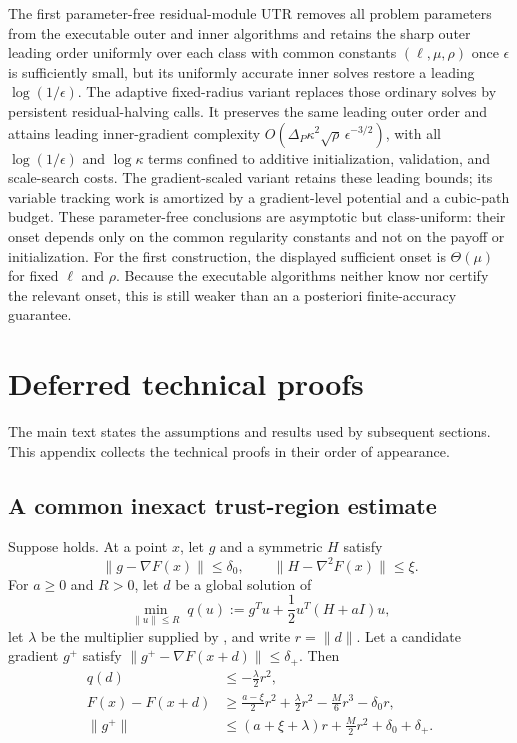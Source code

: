 \documentclass{article}
\begin{document}
The first parameter-free residual-module UTR removes all problem
parameters from the executable outer and inner algorithms and retains
the sharp outer leading order uniformly over each class with common
constants $(\ell,\mu,\rho)$ once $\epsilon$ is sufficiently small,
but its uniformly accurate inner solves restore a leading
$\log(1/\epsilon)$.  The adaptive fixed-radius
variant replaces those ordinary solves by persistent residual-halving
calls.  It preserves the same leading outer order and attains leading
inner-gradient complexity
$O(\Delta_P\kappa^2\sqrt\rho\,\epsilon^{-3/2})$, with all
$\log(1/\epsilon)$ and $\log\kappa$ terms confined to additive
initialization, validation, and scale-search costs.  The gradient-scaled
variant retains these leading bounds; its variable tracking work is
amortized by a gradient-level potential and a cubic-path budget.
These parameter-free conclusions are asymptotic but class-uniform: their
onset depends only on the common regularity constants and not on the
payoff or initialization.  For the first construction, the displayed
sufficient onset is $\Theta(\mu)$ for fixed $\ell$ and $\rho$.  Because
the executable algorithms neither know nor certify the relevant onset,
this is still weaker than an a posteriori finite-accuracy guarantee.

\appendix
\section{Deferred technical proofs}
\label{app:proofs}
The main text states the assumptions and results used by subsequent sections.  This appendix collects the technical proofs in their order of appearance.

\subsection{A common inexact trust-region estimate}
\label{app:common-tr-estimate}

\begin{lemma}
\label{lem:common-inexact-tr-step}
Suppose  holds.  At a point $x$, let $g$ and a
symmetric $H$ satisfy
\[
 \|g-\nabla F(x)\|\le\delta_0,
 \qquad
 \|H-\nabla^2F(x)\|\le\xi.
\]
For $a\ge0$ and $R>0$, let $d$ be a global solution of
\[
 \min_{\|u\|\le R}\;
 q(u):=g^Tu+\frac12u^T(H+aI)u,
\]
let $\lambda$ be the multiplier supplied by
, and write $r=\|d\|$.  Let a candidate
gradient $g^+$ satisfy
$\|g^+-\nabla F(x+d)\|\le\delta_+$.  Then
\begin{subequations}\label{eq:common-tr-estimates}
\begin{align}
 q(d)&\le-\frac{\lambda}{2}r^2,
       \label{eq:common-model-bound}\\
 F(x)-F(x+d)
 &\ge\frac{a-\xi}{2}r^2+\frac{\lambda}{2}r^2
      -\frac M6r^3-\delta_0r,
       \label{eq:common-function-bound}\\
 \|g^+\|
 &\le(a+\xi+\lambda)r+\frac M2r^2+\delta_0+\delta_+.
       \label{eq:common-gradient-bound}
\end{align}
\end{subequations}
\end{lemma}
\end{document}
